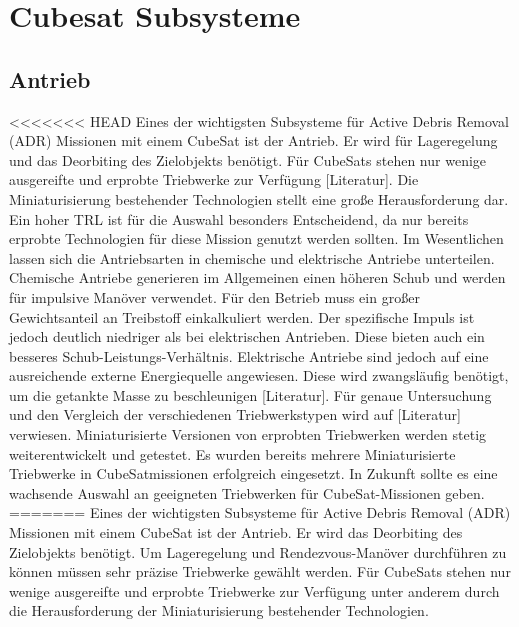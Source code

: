 	\section{Cubesat Subsysteme}%
		\subsection{Antrieb}%
<<<<<<< HEAD
Eines der wichtigsten Subsysteme für Active Debris Removal (ADR) Missionen mit einem CubeSat ist der Antrieb. Er wird für Lageregelung und das Deorbiting des Zielobjekts benötigt.
Für CubeSats stehen nur wenige ausgereifte und erprobte Triebwerke zur Verfügung [Literatur].  Die Miniaturisierung bestehender Technologien stellt eine große Herausforderung dar. Ein hoher TRL ist für die Auswahl besonders Entscheidend, da nur bereits erprobte Technologien für diese Mission genutzt werden sollten.
Im Wesentlichen lassen sich die Antriebsarten in chemische und elektrische Antriebe unterteilen.  Chemische Antriebe generieren im Allgemeinen einen höheren Schub und werden für impulsive Manöver verwendet. Für den Betrieb muss ein großer Gewichtsanteil an Treibstoff einkalkuliert werden. Der spezifische Impuls ist jedoch deutlich niedriger als bei elektrischen Antrieben. Diese bieten auch ein besseres Schub-Leistungs-Verhältnis. Elektrische Antriebe sind jedoch auf eine ausreichende externe Energiequelle angewiesen. Diese wird zwangsläufig benötigt, um die getankte Masse zu beschleunigen [Literatur].
Für genaue Untersuchung und den Vergleich der verschiedenen Triebwerkstypen wird auf [Literatur] verwiesen. Miniaturisierte Versionen von erprobten Triebwerken werden stetig weiterentwickelt und getestet. Es wurden bereits mehrere Miniaturisierte Triebwerke in CubeSatmissionen erfolgreich eingesetzt. In Zukunft sollte es eine wachsende Auswahl an geeigneten Triebwerken für CubeSat-Missionen geben. 
=======
Eines der wichtigsten Subsysteme für Active Debris Removal (ADR) Missionen mit einem CubeSat ist der Antrieb. Er wird das Deorbiting des Zielobjekts benötigt.  Um Lageregelung und Rendezvous-Manöver durchführen zu können müssen sehr präzise Triebwerke gewählt werden. Für CubeSats stehen nur wenige ausgereifte und erprobte Triebwerke zur Verfügung unter anderem durch die Herausforderung der Miniaturisierung bestehender Technologien.  
